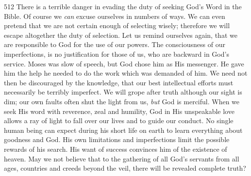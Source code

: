 \begin{tp}{512}
There is a terrible danger in evading the
duty of seeking God’s Word in the Bible.
Of course we \textsl{can} excuse ourselves in
numbers of ways. We can even pretend
that we are not certain enough of selecting
wisely; therefore we will escape altogether
the duty of selection. Let us remind ourselves
again, that we are responsible to God
for the use of our powers. The consciousness
of our imperfections, is no justification for
those of us, who are backward in God’s
service. Moses was slow of speech, but God
chose him as His messenger. He gave him
the help he needed to do the work which was
demanded of him. We need not then be
discouraged by the knowledge, that our best
intellectual efforts must necessarily be
terribly imperfect. We will grope after truth
although our sight is dim; our own faults
often shut the light from us, \textsl{but} God is
merciful. When we seek His word with
reverence, zeal and humility, God in His
unspeakable love allows a ray of light to fall
over our lives and to guide our conduct.
No single human being can expect during his
short life on earth to learn everything about
goodness and God. His own limitations and
imperfections limit the possible rewards of
his search. His want of success convinces
him of the existence of heaven. May we not
believe that to the gathering of all God’s
servants from all ages, countries and creeds
beyond the veil, there will be revealed
complete truth?
\end{tp}

